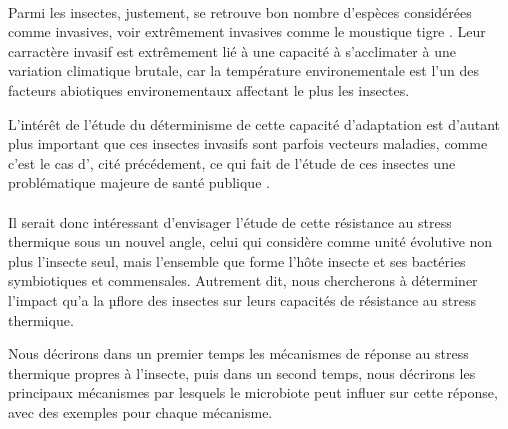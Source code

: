 \paragraph{} %
\label{par:intro2}

Parmi les insectes, justement, se retrouve bon nombre d'espèces considérées
comme invasives, voir extrêmement invasives comme le moustique tigre
. Leur carractère invasif est extrêmement lié à une
capacité à s'acclimater à une variation climatique brutale, car la température
environementale est l'un des facteurs abiotiques environementaux affectant le
plus les insectes.


L'intérêt de l'étude du déterminisme de cette capacité d'adaptation est
d'autant plus important que ces insectes invasifs sont parfois vecteurs
maladies, comme c'est le cas d', cité précédement, ce
qui fait de l'étude de ces insectes une problématique majeure de santé
publique \cite{schaffner2013}.



\paragraph{} %
\label{par:intro3}

Il serait donc intéressant d'envisager l'étude de cette résistance au stress
thermique sous un nouvel angle, celui qui considère comme unité évolutive non
plus l'insecte seul, mais l'ensemble que forme l'hôte insecte et ses bactéries
symbiotiques et commensales. Autrement dit, nous chercherons à déterminer
l'impact qu'a la µflore des insectes sur leurs capacités de résistance au
stress thermique.

Nous décrirons dans un premier temps les mécanismes de réponse au stress
thermique propres à l'insecte, puis dans un second temps, 
nous décrirons les principaux mécanismes par lesquels le microbiote peut influer sur cette réponse, avec des exemples pour chaque mécanisme.






